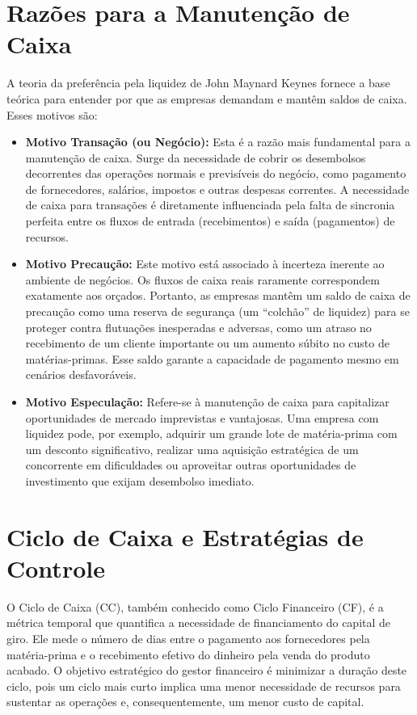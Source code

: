 \documentclass[
  a4paper,
]{book}
\begin{document}
\section{Razões para a Manutenção de
Caixa}\label{razuxf5es-para-a-manutenuxe7uxe3o-de-caixa}

A teoria da preferência pela liquidez de John Maynard Keynes fornece a
base teórica para entender por que as empresas demandam e mantêm saldos
de caixa. Esses motivos são:

\begin{itemize}
\item
  \textbf{Motivo Transação (ou Negócio):} Esta é a razão mais
  fundamental para a manutenção de caixa. Surge da necessidade de cobrir
  os desembolsos decorrentes das operações normais e previsíveis do
  negócio, como pagamento de fornecedores, salários, impostos e outras
  despesas correntes. A necessidade de caixa para transações é
  diretamente influenciada pela falta de sincronia perfeita entre os
  fluxos de entrada (recebimentos) e saída (pagamentos) de recursos.
\item
  \textbf{Motivo Precaução:} Este motivo está associado à incerteza
  inerente ao ambiente de negócios. Os fluxos de caixa reais raramente
  correspondem exatamente aos orçados. Portanto, as empresas mantêm um
  saldo de caixa de precaução como uma reserva de segurança (um
  ``colchão'' de liquidez) para se proteger contra flutuações
  inesperadas e adversas, como um atraso no recebimento de um cliente
  importante ou um aumento súbito no custo de matérias-primas. Esse
  saldo garante a capacidade de pagamento mesmo em cenários
  desfavoráveis.
\item
  \textbf{Motivo Especulação:} Refere-se à manutenção de caixa para
  capitalizar oportunidades de mercado imprevistas e vantajosas. Uma
  empresa com liquidez pode, por exemplo, adquirir um grande lote de
  matéria-prima com um desconto significativo, realizar uma aquisição
  estratégica de um concorrente em dificuldades ou aproveitar outras
  oportunidades de investimento que exijam desembolso imediato.
\end{itemize}

\section{Ciclo de Caixa e Estratégias de
Controle}\label{ciclo-de-caixa-e-estratuxe9gias-de-controle}

O Ciclo de Caixa (CC), também conhecido como Ciclo Financeiro (CF), é a
métrica temporal que quantifica a necessidade de financiamento do
capital de giro. Ele mede o número de dias entre o pagamento aos
fornecedores pela matéria-prima e o recebimento efetivo do dinheiro pela
venda do produto acabado. O objetivo estratégico do gestor financeiro é
minimizar a duração deste ciclo, pois um ciclo mais curto implica uma
menor necessidade de recursos para sustentar as operações e,
consequentemente, um menor custo de capital.
\end{document}
